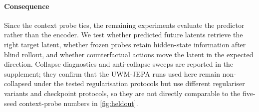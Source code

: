 \paragraph{Consequence}
Since the context probe ties, the remaining experiments evaluate the
predictor rather than the encoder. We test whether predicted future
latents retrieve the right target latent, whether frozen probes retain
hidden-state information after blind rollout, and whether counterfactual
actions move the latent in the expected direction. Collapse diagnostics
and anti-collapse sweeps are reported in the supplement; they confirm
that the UWM-JEPA runs used here remain non-collapsed under the tested
regularisation protocols but use different regulariser variants and
checkpoint protocols, so they are not directly comparable to the
five-seed context-probe numbers in \cref{fig:heldout}.
